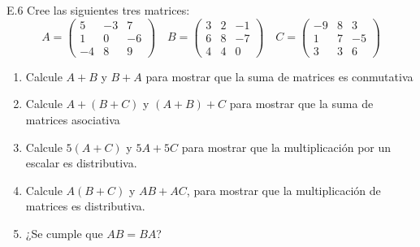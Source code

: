 \documentclass[11pt]{report}
\begin{document}
    E.6 Cree las siguientes tres matrices: \[
    A = \begin{pmatrix}
        5 & -3 & 7 \\
        1 & 0 & -6 \\
        -4 & 8 & 9
    \end{pmatrix}\quad
    B = \begin{pmatrix}
        3 & 2 & -1 \\
        6 & 8 & -7 \\
        4 & 4 & 0
    \end{pmatrix}\quad
    C = \begin{pmatrix}
        -9 & 8 & 3 \\
        1 & 7 & -5 \\
        3 & 3 & 6
    \end{pmatrix}
\]

\begin{enumerate}
\def\labelenumi{\alph{enumi})}
\item
  Calcule \(A+B\) y \(B+A\) para mostrar que la suma de matrices es
  conmutativa
\item
  Calcule \(A+(B+C)\) y \((A+B)+C\) para mostrar que la suma de matrices
  asociativa
\item
  Calcule \(5(A+C)\) y \(5A+5C\) para mostrar que la multiplicación por
  un escalar es distributiva.
\item
  Calcule \(A(B+C)\) y \(AB+AC\), para mostrar que la multiplicación de
  matrices es distributiva.
\item
  ¿Se cumple que \(AB = BA\)?
\end{enumerate}
\end{document}
